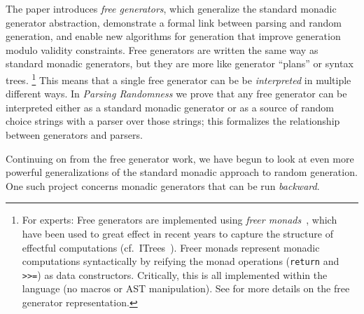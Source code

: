 The paper introduces {\em free generators}, which generalize the standard
monadic generator abstraction, demonstrate a formal link between parsing and
random generation, and enable new algorithms for generation that improve
generation modulo validity constraints. Free generators are written the same
way as standard monadic generators, but they are more like generator ``plans''
or syntax trees.%
\footnote{For experts: Free generators are implemented using {\em freer
monads}~\cite{kiselyov2015freer}, which have been used to great effect in recent
years to capture the structure of effectful computations
(cf.~ITrees~\cite{old:xia2019interaction}). Freer monads represent
monadic computations syntactically by reifying the monad operations
(\lstinline{return} and \lstinline{>>=}) as data constructors. Critically, this
is all implemented within the language (no macros or AST
manipulation). See \cite{goldstein2022parsing} for more details on the
free generator representation.}
This means that a single free generator can be be {\em interpreted} in multiple
different ways. In {\em Parsing Randomness} we prove that any free generator can
be interpreted either as a standard monadic generator or as a source of
random choice strings with a parser over those strings; this formalizes the
relationship between generators and parsers.

Continuing on from the free generator work, we have begun to look at even more
powerful generalizations of the standard monadic approach to random generation.
One such project concerns monadic generators that can be run {\em backward}.


